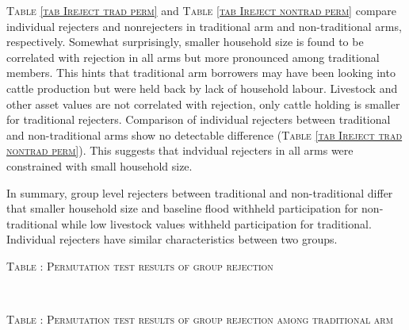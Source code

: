 	\textsc{\normalsize Table \ref{tab Ireject trad perm}} and \textsc{\normalsize Table \ref{tab Ireject nontrad perm}} compare individual rejecters and nonrejecters in \textsf{traditional} arm and non-\textsf{traditional} arms, respectively. Somewhat surprisingly, smaller household size is found to be correlated with rejection in all arms but more pronounced among \textsf{traditional} members. This hints that \textsf{traditional} arm borrowers may have been looking into cattle production but were held back by lack of household labour. Livestock and other asset values are not correlated with rejection, only cattle holding is smaller for \textsf{traditional} rejecters. Comparison of individual rejecters between \textsf{traditional} and non-\textsf{traditional} arms show no detectable difference (\textsc{\normalsize Table \ref{tab Ireject trad nontrad perm}}). This suggests that indvidual rejecters in all arms were constrained with small household size.

	In summary, group level rejecters between \textsf{traditional} and non-\textsf{traditional} differ that smaller household size and baseline flood withheld participation for non-\textsf{traditional} while low livestock values withheld participation for \textsf{traditional}. Individual rejecters have similar characteristics between two groups.

\hfil\begin{minipage}[t]{14cm}
\hfil\textsc{\normalsize Table \thetable: Permutation test results of group rejection\label{tab Greject perm}}\\
\setlength{\tabcolsep}{.5pt}
\setlength{\baselineskip}{8pt}
\renewcommand{\arraystretch}{.50}
\hfil{}\\
\end{minipage}

\hfil\begin{minipage}[t]{14cm}
\hfil\textsc{\normalsize Table \thetable: Permutation test results of group rejection among traditional arm\label{tab Greject trad perm}}\\
\setlength{\tabcolsep}{.5pt}
\setlength{\baselineskip}{8pt}
\renewcommand{\arraystretch}{.50}
\hfil{}\\
\end{minipage}

